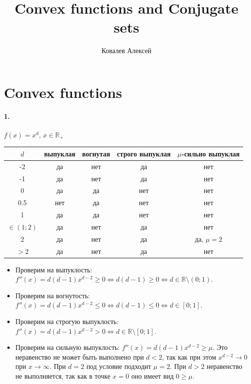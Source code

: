 \documentclass{article}
\title{Convex functions and Conjugate sets}
\author{Ковалев Алексей}
\date{}
\newcommand*{\R}{\mathbb{R}}
\begin{document}
\maketitle

\section*{Convex functions}
\paragraph{1.} $f(x) = x^d,\, x \in \R_+$
\begin{center}
\begin{tabular}{|c|c|c|c|c|} \hline
    $d$          & выпуклая & вогнутая & строго выпуклая & $\mu$-сильно выпуклая \\ \hline 
    -2           &    да    &    нет   &       да        &          нет         \\ \hline 
    -1           &    да    &    нет   &       да        &          нет         \\ \hline
    0            &    да    &    да    &       нет       &          нет         \\ \hline
    0.5          &    нет   &    да    &       нет       &          нет         \\ \hline
    1            &    да    &    да    &       нет       &          нет         \\ \hline 
    $\in (1; 2)$ &    да    &    нет   &       да        &          нет         \\ \hline
    2            &    да    &    нет   &       да        &      да, $\mu = 2$   \\ \hline
    $> 2$        &    да    &    нет   &       да        &          нет         \\ \hline
\end{tabular}
\end{center}
\begin{itemize}
    \item Проверим на выпуклость: $f''(x) = d(d - 1)x^{d - 2} \geqslant 0 \iff d(d - 1) \geqslant 0 \iff d \in \R \setminus (0; 1)$.
    \item Проверим на вогнутость: $f''(x) = d(d - 1)x^{d - 2} \leqslant 0 \iff d(d - 1) \leqslant 0 \iff d \in [0; 1]$.
    \item Проверим на строгую выпуклость: $f''(x) = d(d - 1) x^{d - 2} > 0 \iff d \in \R \setminus [0; 1]$. 
    \item Проверим на сильную выпуклость: $f''(x) = d(d - 1)x^{d - 2} \geqslant \mu$. Это неравенство не может быть выполнено при $d < 2$, так как при этом $x^{d - 2} \longrightarrow 0$ при $x \longrightarrow \infty$. При $d = 2$ под условие подходит $\mu = 2$. При $d > 2$ неравенство не выполняется, так как в точке $x = 0$ оно имеет вид $0 \geqslant \mu$.
\end{itemize}
\end{document}
